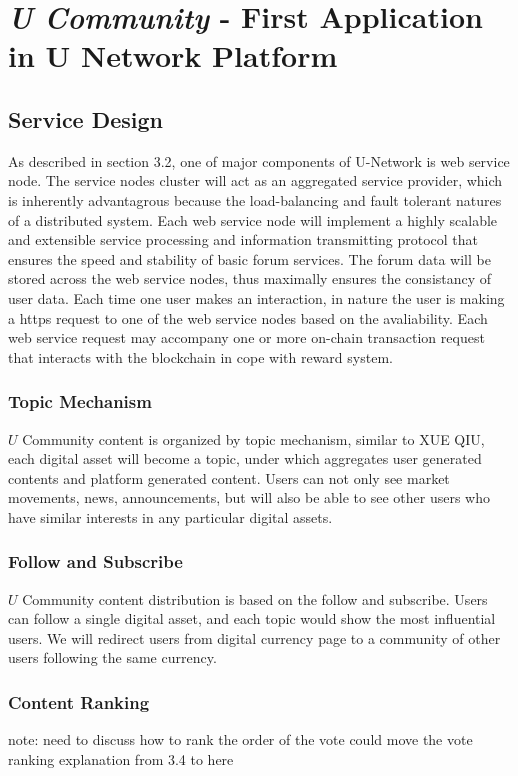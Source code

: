 \chapter{\emph{U Community} - First Application in U Network Platform}
\section{Service Design}
As described in section 3.2, one of major components of U-Network is web service node. The service nodes cluster will act as an aggregated service provider, which is inherently advantagrous because the load-balancing and fault tolerant natures of a distributed system. Each web service node will implement a highly scalable and extensible service processing and information transmitting protocol that ensures the speed and stability of basic forum services. 
The forum data will be stored across the web service nodes, thus maximally ensures the consistancy of user data. Each time one user makes an interaction, in nature the user is making a https request to one of the web service nodes based on the avaliability. Each web service request may accompany one or more on-chain transaction request that interacts with the blockchain in cope with reward system. 
\subsection{Topic Mechanism}
$U$ Community content is organized by topic mechanism, similar to XUE QIU\cite{xueqiu}, each digital asset will become a topic, under which aggregates user generated contents and platform generated content. Users can not only see market movements, news, announcements, but will also be able to see other users who have similar interests in any particular digital assets. 
\subsection{Follow and Subscribe}
$U$ Community content distribution is based on the follow and subscribe. Users can follow a single digital asset, and each topic would show the most influential users. We will redirect users from digital currency page to a community of other users following the same currency. 
\subsection{Content Ranking}
{\color{red} note: need to discuss how to rank the order of the vote}
{\color{blue} could move the vote ranking explanation from 3.4 to here}


